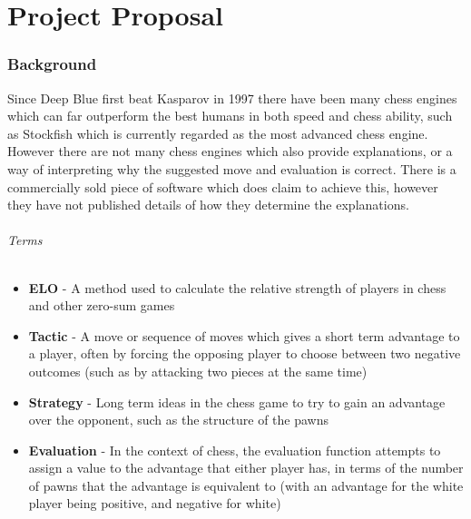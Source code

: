 \documentclass[12pt,a4paper]{article}
\begin{document}
\part*{Project Proposal}

\section*{Background}
Since Deep Blue first beat Kasparov in 1997 there have been many chess engines which can far outperform the best humans in both speed and chess ability, such as Stockfish which is currently regarded as the most advanced chess engine. However there are not many chess engines which also provide explanations, or a way of interpreting why the suggested move and evaluation is correct. There is a commercially sold piece of software which does claim to achieve this, however they have not published details of how they determine the explanations.

\paragraph*{Terms}
\begin{itemize}
    \item \textbf{ELO} - A method used to calculate the relative strength of players in chess and other zero-sum games
    \item \textbf{Tactic} - A move or sequence of moves which gives a short term advantage to a player, often by forcing the opposing player to choose between two negative outcomes (such as by attacking two pieces at the same time)
    \item \textbf{Strategy} - Long term ideas in the chess game to try to gain an advantage over the opponent, such as the structure of the pawns
    \item \textbf{Evaluation} - In the context of chess, the evaluation function attempts to assign a value to the advantage that either player has, in terms of the number of pawns that the advantage is equivalent to (with an advantage for the white player being positive, and negative for white)
\end{itemize}
\end{document}
